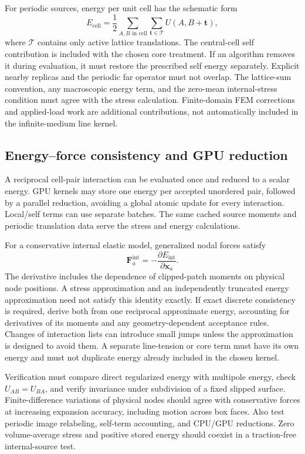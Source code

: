 For periodic sources, energy per unit cell has the schematic form
\begin{equation}
 E_{\mathrm{cell}}=\frac12\sum_{A,B\text{ in cell}}
 \sum_{\bm t\in\mathcal T}U(A,B+\bm t),
 \label{eq:patchPeriodicEnergy}
\end{equation}
where $\mathcal T$ contains only active lattice translations. The central-cell self contribution is included with the chosen core treatment. If an algorithm removes it during evaluation, it must restore the prescribed self energy separately. Explicit nearby replicas and the periodic far operator must not overlap. The lattice-sum convention, any macroscopic energy term, and the zero-mean internal-stress condition must agree with the stress calculation. Finite-domain FEM corrections and applied-load work are additional contributions, not automatically included in the infinite-medium line kernel.

\subsection{Energy--force consistency and GPU reduction}
A reciprocal cell-pair interaction can be evaluated once and reduced to a scalar energy. GPU kernels may store one energy per accepted unordered pair, followed by a parallel reduction, avoiding a global atomic update for every interaction. Local/self terms can use separate batches. The same cached source moments and periodic translation data serve the stress and energy calculations.

For a conservative internal elastic model, generalized nodal forces satisfy
\begin{equation}
 \bm F_a^{\mathrm{int}}=-\frac{\partial E_{\mathrm{int}}}{\partial\bm x_a}.
\end{equation}
The derivative includes the dependence of clipped-patch moments on physical node positions. A stress approximation and an independently truncated energy approximation need not satisfy this identity exactly. If exact discrete consistency is required, derive both from one reciprocal approximate energy, accounting for derivatives of its moments and any geometry-dependent acceptance rules. Changes of interaction lists can introduce small jumps unless the approximation is designed to avoid them. A separate line-tension or core term must have its own energy and must not duplicate energy already included in the chosen kernel.

Verification must compare direct regularized energy with multipole energy, check $U_{AB}=U_{BA}$, and verify invariance under subdivision of a fixed slipped surface. Finite-difference variations of physical nodes should agree with conservative forces at increasing expansion accuracy, including motion across box faces. Also test periodic image relabeling, self-term accounting, and CPU/GPU reductions. Zero volume-average stress and positive stored energy should coexist in a traction-free internal-source test.


